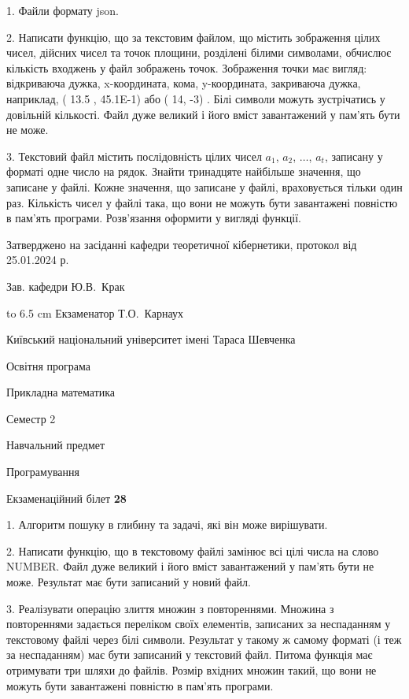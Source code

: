 \documentclass[12pt, ukrainian]{article}
\begin{document}
{%
1. Файли формату json.%
\par
2. Написати функцію, що за текстовим файлом, що містить зображення цілих чисел, дійсних чисел та точок площини, розділені білими символами, обчислює кількість входжень у файл зображень точок. Зображення точки має вигляд: відкриваюча дужка, x-координата, кома, y-координата, закриваюча дужка, наприклад, ( 13.5 , 45.1E-1) або ( 14, -3) . Білі символи можуть зустрічатись у довільній кількості. Файл дуже великий і його вміст завантажений у пам'ять бути не може.

\par
3. Текстовий файл містить послідовність цілих чисел $a_1$, $a_2$, $\ldots$, $a_t$, записану у форматі одне число на рядок. Знайти тринадцяте найбільше значення, що записане у файлі. Кожне значення, що записане у файлі, враховується тільки один раз. Кількість чисел у файлі така, що вони не можуть бути завантажені повністю в пам'ять програми. Розв'язання оформити у вигляді функції.

}
{\smallskip\smallskip \begin {scriptsize} Затверджено на засіданні кафедри теоретичної кібернетики, протокол   від   25.01.2024 р.\par\smallskip\smallskip\smallskip\smallskip
{\parbox {6.5 cm} {Зав. кафедри \dotfill Ю.В.~Крак}}\hspace {0.7cm} {\hbox to 6.5 cm { Екзаменатор \dotfill Т.О.~Карнаух}} \end{scriptsize}}
\newpage
{{\begin {scriptsize}\par
{ \center  Київський національний університет імені Тараса Шевченка \par}
{\parbox {5 cm}{Освітня програма \hfill}{\parbox {7 cm}{Прикладна математика\hfill}}\parbox {6 cm}{\hfill Семестр 2}}\par
{\parbox {5 cm} {Навчальний предмет \hfill}\parbox {7 cm}{Програмування \hfill}\parbox {6cm}{\hfill}\par}\vspace{-15pt} \end{scriptsize}}{\center Екзаменаційний білет \No \textbf { 28 }\par}}
{%
1. Алгоритм пошуку в глибину та задачі, які він може вирішувати.%
\par
2. Написати функцію, що в текстовому файлі замінює всі цілі числа на слово NUMBER. Файл дуже великий і його вміст завантажений у пам'ять бути не може. Результат має бути записаний у новий файл.

\par
3. Реалізувати операцію злиття множин з повтореннями. Множина з повтореннями задається переліком своїх елементів, записаних за неспаданням у текстовому файлі через білі символи. Результат у такому ж самому форматі (і теж за неспаданням) має бути записаний у текстовий файл. Питома функція має отримувати три шляхи до файлів. Розмір вхідних множин такий, що вони не можуть бути завантажені повністю в пам’ять програми.

}
\end{document}
